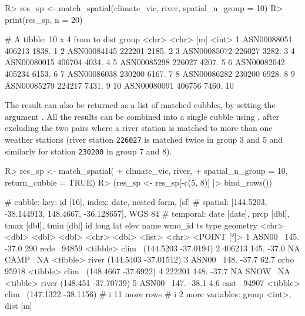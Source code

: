 \documentclass[
  shortnames]{jss}
\begin{document}
\begin{CodeChunk}
\begin{CodeInput}
R> res_sp <- match_spatial(climate_vic, river, spatial_n_group = 10)
R> print(res_sp, n = 20)
\end{CodeInput}
\begin{CodeOutput}
# A tibble: 10 x 4
   from        to      dist group
   <chr>       <chr>    [m] <int>
 1 ASN00088051 406213 1838.     1
 2 ASN00084145 222201 2185.     2
 3 ASN00085072 226027 3282.     3
 4 ASN00080015 406704 4034.     4
 5 ASN00085298 226027 4207.     5
 6 ASN00082042 405234 6153.     6
 7 ASN00086038 230200 6167.     7
 8 ASN00086282 230200 6928.     8
 9 ASN00085279 224217 7431.     9
10 ASN00080091 406756 7460.    10
\end{CodeOutput}
\end{CodeChunk}

The result can also be returned as a list of matched cubbles, by setting the argument . All the results can be combined into a single cubble using , after excluding the two pairs where a river station is matched to more than one weather stations (river station \texttt{226027} is matched twice in group 3 and 5 and similarly for station \texttt{230200} in group 7 and 8).

\begin{CodeChunk}
\begin{CodeInput}
R> res_sp <- match_spatial(
+   climate_vic, river, 
+   spatial_n_group = 10, return_cubble = TRUE)
R> (res_sp <- res_sp[-c(5, 8)] |> bind_rows())
\end{CodeInput}
\begin{CodeOutput}
# cubble:   key: id [16], index: date, nested form, [sf]
# spatial:  [144.5203, -38.144913, 148.4667, -36.128657], WGS 84
# temporal: date [date], prcp [dbl], tmax [dbl], tmin [dbl]
  id      long   lat  elev name  wmo_id ts       type              geometry
  <chr>  <dbl> <dbl> <dbl> <chr>  <dbl> <list>   <chr>          <POINT [°]>
1 ASN00~  145. -37.0 290   rede~  94859 <tibble> clim~  (144.5203 -37.0194)
2 406213  145. -37.0  NA   CAMP~     NA <tibble> river (144.5403 -37.01512)
3 ASN00~  148. -37.7  62.7 orbo~  95918 <tibble> clim~  (148.4667 -37.6922)
4 222201  148. -37.7  NA   SNOW~     NA <tibble> river  (148.451 -37.70739)
5 ASN00~  147. -38.1   4.6 east~  94907 <tibble> clim~  (147.1322 -38.1156)
# i 11 more rows
# i 2 more variables: group <int>, dist [m]
\end{CodeOutput}
\end{CodeChunk}
\end{document}
